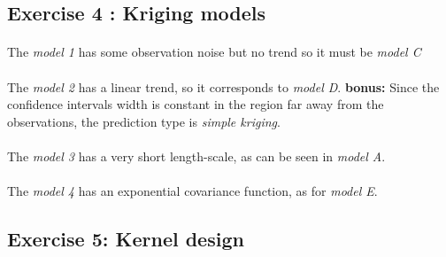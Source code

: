 \documentclass[a4paper,10pt]{article}
\begin{document}
\subsection*{Exercise 4 : Kriging models}

\paragraph{}
The \emph{model 1} has some observation noise but no trend so it must be \emph{model C}

\paragraph{}
The \emph{model 2} has a linear trend, so it corresponds to \emph{model D}. \textbf{bonus:} Since the confidence intervals width is constant in the region far away from the observations, the prediction type is \emph{simple kriging}.

\paragraph{}
The \emph{model 3} has a very short length-scale, as can be seen in \emph{model A}.

\paragraph{}
The \emph{model 4} has an exponential covariance function, as for \emph{model E}.

\subsection*{Exercise 5: Kernel design}
\end{document}
